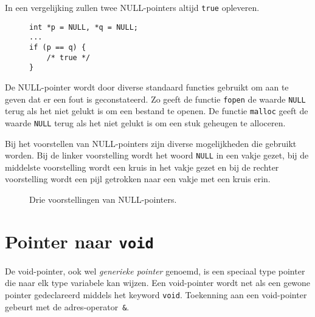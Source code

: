 In een vergelijking zullen twee NULL-pointers altijd \texttt{true} opleveren.

\begin{figure}[H]
\begin{lstlisting}[caption=Vergelijken van twee NULL-pointers.]
int *p = NULL, *q = NULL;
...
if (p == q) {
    /* true */
}
\end{lstlisting}
\end{figure}

De NULL-pointer wordt door diverse standaard functies gebruikt om aan te geven dat er een fout is geconstateerd. Zo geeft de functie \texttt{fopen} de waarde \texttt{NULL} terug als het niet gelukt is om een bestand te openen. De functie \texttt{malloc} geeft de waarde \texttt{NULL} terug als het niet gelukt is om een stuk geheugen te alloceren.

Bij het voorstellen van NULL-pointers zijn diverse mogelijkheden die gebruikt worden. Bij de linker voorstelling wordt het woord \texttt{NULL} in een vakje gezet, bij de middelste voorstelling wordt een kruis in het vakje gezet en bij de rechter voorstelling wordt een pijl getrokken naar een vakje met een kruis erin.

\begin{figure}[!ht]
\centering
{}
\caption{Drie voorstellingen van NULL-pointers.}
\label{fig:poinullpointers}
\end{figure}


\section{Pointer naar \texttt{void}}
\label{sec:pointertovoid}

De void-pointer, ook wel \textsl{generieke pointer} genoemd, is een speciaal type pointer die naar elk type variabele kan wijzen. Een void-pointer wordt net als een gewone pointer gedeclareerd middels het keyword \texttt{void}. Toekenning aan een void-pointer gebeurt met de adres-operator~\texttt{\&}.

